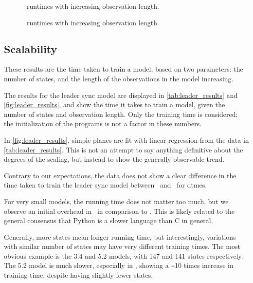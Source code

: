 \begin{figure}
    
    \caption{\Cupaal\ runtimes with increasing observation length.}
    \label{fig:cupaal-length-to-runtime}
\end{figure}


\begin{figure}
    
    \caption{\Jajapy\ runtimes with increasing observation length.}
    \label{fig:jajapy-length-to-runtime}
\end{figure}


\subsection{Scalability}\label{subsec:scalability}
These results are the time taken to train a model, based on two parameters: the number of states, and the length of the observations in the model increasing.

The results for the leader sync model are displayed in \autoref{tab:leader_results} and \autoref{fig:leader_results}, and show the time it takes to train a model, given the number of states and observation length.
Only the training time is considered; the initialization of the programs is not a factor in these numbers.

In \autoref{fig:leader_results}, simple planes are fit with linear regression from the data in \autoref{tab:leader_results}.
This is not an attempt to say anything definitive about the degrees of the scaling, but instead to show the generally observable trend.

Contrary to our expectations, the data does not show a clear difference in the time taken to train the leader sync model between \Jajapy\ and \Cupaal\ for \glspl{dtmc}.

For very small models, the running time does not matter too much, but we observe an initial overhead in \Jajapy\ in comparison to \Cupaal.
This is likely related to the general consensus that Python is a slower language than C in general.

Generally, more states mean longer running time, but interestingly, variations with similar number of states may have very different training times.
The most obvious example is the 3.4 and 5.2 models, with 147 and 141 states respectively.
The 5.2 model is much slower, especially in \Cupaal, showing a \textasciitilde10 times increase in training time, despite having slightly fewer states.

